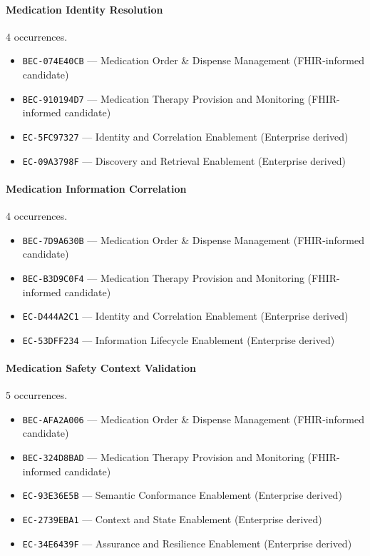 \documentclass[11pt,a4paper,openany]{book}
\begin{document}
\paragraph{Medication Identity Resolution} 4 occurrences.\par
\begin{itemize}
\item \texttt{BEC-074E40CB} --- Medication Order \& Dispense Management (FHIR-informed candidate)
\item \texttt{BEC-910194D7} --- Medication Therapy Provision and Monitoring (FHIR-informed candidate)
\item \texttt{EC-5FC97327} --- Identity and Correlation Enablement (Enterprise derived)
\item \texttt{EC-09A3798F} --- Discovery and Retrieval Enablement (Enterprise derived)
\end{itemize}
\paragraph{Medication Information Correlation} 4 occurrences.\par
\begin{itemize}
\item \texttt{BEC-7D9A630B} --- Medication Order \& Dispense Management (FHIR-informed candidate)
\item \texttt{BEC-B3D9C0F4} --- Medication Therapy Provision and Monitoring (FHIR-informed candidate)
\item \texttt{EC-D444A2C1} --- Identity and Correlation Enablement (Enterprise derived)
\item \texttt{EC-53DFF234} --- Information Lifecycle Enablement (Enterprise derived)
\end{itemize}
\paragraph{Medication Safety Context Validation} 5 occurrences.\par
\begin{itemize}
\item \texttt{BEC-AFA2A006} --- Medication Order \& Dispense Management (FHIR-informed candidate)
\item \texttt{BEC-324D8BAD} --- Medication Therapy Provision and Monitoring (FHIR-informed candidate)
\item \texttt{EC-93E36E5B} --- Semantic Conformance Enablement (Enterprise derived)
\item \texttt{EC-2739EBA1} --- Context and State Enablement (Enterprise derived)
\item \texttt{EC-34E6439F} --- Assurance and Resilience Enablement (Enterprise derived)
\end{itemize}
\end{document}

